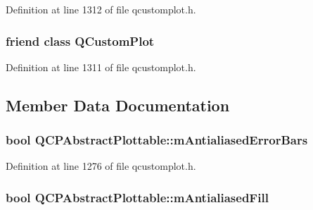 Definition at line 1312 of file qcustomplot.\-h.

\hypertarget{class_q_c_p_abstract_plottable_a1cdf9df76adcfae45261690aa0ca2198}{
\subsubsection[{Q\-Custom\-Plot}]{\setlength{\rightskip}{0pt plus 5cm}friend class {\bf Q\-Custom\-Plot}\hspace{0.3cm}{\ttfamily [friend]}}}\label{class_q_c_p_abstract_plottable_a1cdf9df76adcfae45261690aa0ca2198}


Definition at line 1311 of file qcustomplot.\-h.



\subsection{Member Data Documentation}
\hypertarget{class_q_c_p_abstract_plottable_ad48660b2bd301576e92fb033d8f455ea}{
\subsubsection[{m\-Antialiased\-Error\-Bars}]{\setlength{\rightskip}{0pt plus 5cm}bool Q\-C\-P\-Abstract\-Plottable\-::m\-Antialiased\-Error\-Bars\hspace{0.3cm}{\ttfamily [protected]}}}\label{class_q_c_p_abstract_plottable_ad48660b2bd301576e92fb033d8f455ea}


Definition at line 1276 of file qcustomplot.\-h.

\hypertarget{class_q_c_p_abstract_plottable_a152ac765bedf927fb240545d11d453ea}{
\subsubsection[{m\-Antialiased\-Fill}]{\setlength{\rightskip}{0pt plus 5cm}bool Q\-C\-P\-Abstract\-Plottable\-::m\-Antialiased\-Fill\hspace{0.3cm}{\ttfamily [protected]}}}\label{class_q_c_p_abstract_plottable_a152ac765bedf927fb240545d11d453ea}


